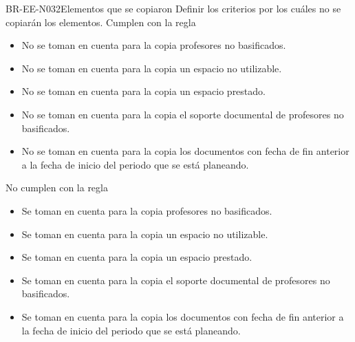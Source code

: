 \begin{BusinessRule}{BR-EE-N032}{Elementos que se copiaron}
	\BRItem[Motivación] Definir los criterios por los cuáles no se copiarán los elementos.
	 Cumplen con la regla
	\begin{itemize}
		\item No se toman en cuenta para la copia profesores no basificados.
		\item No se toman en cuenta para la copia un espacio no utilizable.
		\item No se toman en cuenta para la copia un espacio prestado.
		\item No se toman en cuenta para la copia el soporte documental de profesores no basificados.
		\item No se toman en cuenta para la copia los documentos con fecha de fin anterior a la fecha de inicio del periodo que se está planeando.	
	\end{itemize}
	 No cumplen con la regla
	\begin{itemize}
		\item Se toman en cuenta para la copia profesores no basificados.
		\item Se toman en cuenta para la copia un espacio no utilizable.
		\item Se toman en cuenta para la copia un espacio prestado.
		\item Se toman en cuenta para la copia el soporte documental de profesores no basificados.
		\item Se toman en cuenta para la copia los documentos con fecha de fin anterior a la fecha de inicio del periodo que se está planeando.	
	\end{itemize}
\end{BusinessRule}


